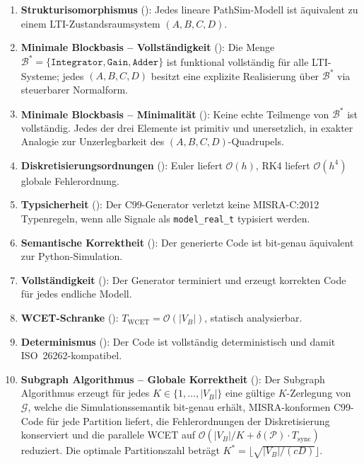 ﻿\documentclass[12pt,a4paper]{article}
\theoremstyle{definition}
\begin{document}
\begin{enumerate}[label=\textbf{S\arabic*.}]
  \item \textbf{Strukturisomorphismus} (): Jedes lineare PathSim-Modell
        ist äquivalent zu einem LTI-Zustandsraumsystem $(A,B,C,D)$.
  \item \textbf{Minimale Blockbasis -- Vollständigkeit} ():
        Die Menge $\mathcal{B}^* = \{\texttt{Integrator}, \texttt{Gain},
        \texttt{Adder}\}$ ist funktional vollständig für alle LTI-Systeme;
        jedes $(A,B,C,D)$ besitzt eine explizite Realisierung über $\mathcal{B}^*$
        via steuerbarer Normalform.
  \item \textbf{Minimale Blockbasis -- Minimalität} ():
        Keine echte Teilmenge von $\mathcal{B}^*$ ist vollständig. Jedes
        der drei Elemente ist primitiv und unersetzlich, in exakter Analogie
        zur Unzerlegbarkeit des $(A,B,C,D)$-Quadrupels.
  \item \textbf{Diskretisierungsordnungen} (): Euler liefert
        $\mathcal{O}(h)$, RK4 liefert $\mathcal{O}(h^4)$ globale Fehlerordnung.
  \item \textbf{Typsicherheit} (): Der C99-Generator verletzt
        keine MISRA-C:2012 Typenregeln, wenn alle Signale als
        \texttt{model\_real\_t} typisiert werden.
  \item \textbf{Semantische Korrektheit} (): Der generierte
        Code ist bit-genau äquivalent zur Python-Simulation.
  \item \textbf{Vollständigkeit} (): Der Generator terminiert
        und erzeugt korrekten Code für jedes endliche Modell.
  \item \textbf{WCET-Schranke} (): $T_{\mathrm{WCET}} = \mathcal{O}(|V_B|)$,
        statisch analysierbar.
  \item \textbf{Determinismus} (): Der Code ist vollständig
        deterministisch und damit ISO~26262-kompatibel.
  \item \textbf{Subgraph Algorithmus -- Globale Korrektheit}
        ():
        Der Subgraph Algorithmus erzeugt für jedes $K \in \{1,\ldots,|V_B|\}$
        eine gültige $K$-Zerlegung von $\mathcal{G}$, welche die
        Simulationssemantik bit-genau erhält, MISRA-konformen C99-Code
        für jede Partition liefert, die Fehlerordnungen der Diskretisierung
        konserviert und die parallele WCET auf
        $\mathcal{O}(|V_B|/K + \delta(\mathcal{P}) \cdot T_{\mathrm{sync}})$
        reduziert. Die optimale Partitionszahl beträgt
        $K^* = \lfloor\sqrt{|V_B|/(cD)}\rfloor$.
\end{enumerate}
\end{document}
